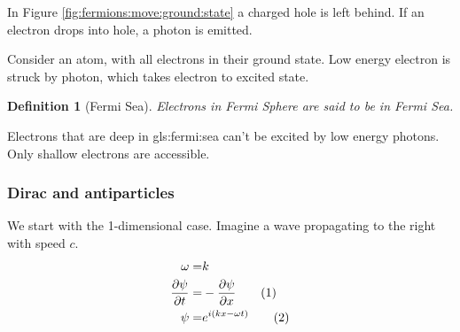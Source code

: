 \documentclass[]{article}
\newcommand\numberthis{\addtocounter{equation}{1}\tag{\theequation}}
\newtheorem{defn}[thm]{Definition}
\begin{document}
\begin{figure}[H]
\begin{subfigure}[t]{0.45\textwidth}
	\end{subfigure}
\end{figure}

In Figure \ref{fig:fermions:move:ground:state} a charged hole is left behind.
If an electron drops into hole, a photon is emitted.

Consider an atom, with all electrons in their ground state. Low energy electron is struck by photon, which takes electron to excited state.

\begin{defn}[Fermi Sea]
	Electrons in Fermi Sphere are said to be in Fermi Sea.
\end{defn}

Electrons that are deep in \gls{gls:fermi:sea} can't be excited by low energy photons. Only shallow electrons are accessible.

\subsubsection{Dirac and antiparticles}

We start with the 1-dimensional case. Imagine a wave propagating to the right with speed $c$.
\begin{align*}
	\omega =& k\\
	\frac{\partial \psi}{\partial t} =& - \frac{\partial \psi}{\partial x}  \numberthis \label{eq:rh:dirac}\\
	\psi =& e^{i(kx-\omega t)} \numberthis \label{eq:rh:dirac:wave}
\end{align*}
\end{document}

